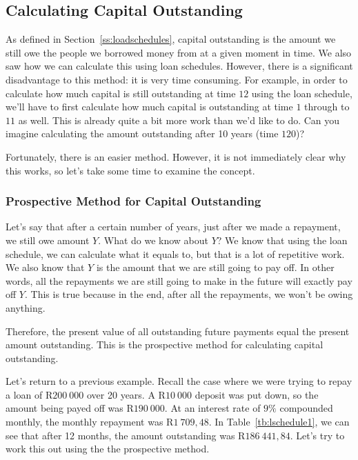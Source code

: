 \subsection{Calculating Capital Outstanding}
\label{ss:capitaloutstanding}

As defined in Section~\ref{ss:loadschedules}, capital outstanding is the amount we still owe the people we borrowed money from at a given moment in time. We also saw how we can calculate this using loan schedules. However, there is a significant disadvantage to this method: it is very time consuming. For example, in order to calculate how much capital is still outstanding at time $12$ using the loan schedule, we'll have to first calculate how much capital is outstanding at time $1$ through to $11$ as well. This is already quite a bit more work than we'd like to do. Can you imagine calculating the amount outstanding after 10 years (time $120$)?

Fortunately, there is an easier method. However, it is not immediately clear why this works, so let's take some time to examine the concept.

\subsubsection{Prospective Method for Capital Outstanding}

Let's say that after a certain number of years, just after we made a repayment, we still owe amount $Y$. What do we know about $Y$? We know that using the loan schedule, we can calculate what it equals to, but that is a lot of repetitive work. We also know that $Y$ is the amount that we are still going to pay off. In other words, all the repayments we are still going to make in the future will exactly pay off $Y$. This is true because in the end, after all the repayments, we won't be owing anything.

Therefore, the present value of all outstanding future payments equal the present amount outstanding. This is the prospective method for calculating capital outstanding.

Let's return to a previous example. Recall the case where we were trying to repay a loan of R$200~000$ over 20 years. A R$10~000$ deposit was put down, so the amount being payed off was R$190~000$. At an interest rate of $9\%$ compounded monthly, the monthly repayment was R$1~709,48$. In Table~\ref{tb:lschedule1}, we can see that after 12 months, the amount outstanding was R$186~441,84$. Let's try to work this out using the the prospective method.

